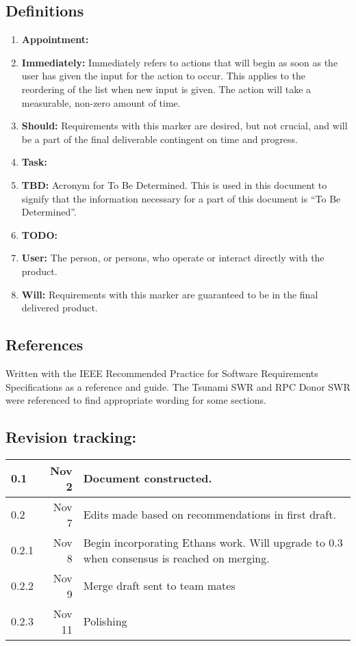 \documentclass[12pt,a4paper]{article}
\begin{document}
\subsection{Definitions}
\begin{enumerate}
\item \textbf{Appointment:}
\item \textbf{Immediately:} Immediately refers to actions that will begin as soon as the user has given the input for the action to occur.  This applies to the reordering of the list when new input is given.  The action will take a measurable, non-zero amount of time.
\item \textbf{Should:} Requirements with this marker are desired, but not crucial, and will be a part of the final deliverable contingent on time and progress.
\item \textbf{Task:}
\item \textbf{TBD:} Acronym for To Be Determined. This is used in this document to signify that the information necessary for a part of this document is ``To Be Determined''.
\item \textbf{TODO:}
\item \textbf{User:} The person, or persons, who operate or interact directly with the product.
\item \textbf{Will:} Requirements with this marker are guaranteed to be in the final delivered product.
\end{enumerate}

\subsection{References}
Written with the IEEE Recommended Practice for Software Requirements Specifications as a reference and guide. The Tsunami SWR and RPC Donor SWR were referenced to find appropriate wording for some sections.

\subsection{Revision tracking:}
\begin{tabular}{|l|r|p{5.5in}|}
\hline
0.1 & Nov 2 & Document constructed.\\
\hline
0.2 & Nov 7 & Edits made based on recommendations in first draft.\\
\hline
0.2.1 & Nov 8 & Begin incorporating Ethans work. Will upgrade to 0.3 when consensus is reached on merging. \\
\hline
0.2.2 & Nov 9 & Merge draft sent to team mates\\
\hline
0.2.3 & Nov 11 & Polishing \\
\hline
\end{tabular}
\end{document}
